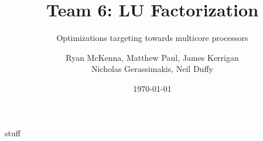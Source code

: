 \documentclass{beamer}
\author{Ryan McKenna, Matthew Paul, James Kerrigan \\
Nicholas Gerassimakis, Neil Duffy }
\title{Team 6: LU Factorization}
\subtitle{Optimizations targeting towards multicore processors}
\date{\today}
\begin{document}
\frame{\maketitle}

\begin{frame}

stuff
	
\end{frame}
\end{document}
